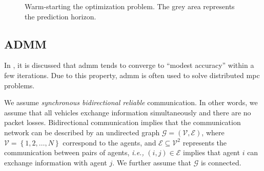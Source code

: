 \begin{figure}[!htbp]
    \centering
    
    
    \caption{Warm-starting the optimization problem. The grey area represents the prediction horizon.}
    \label{fig:MPC_warm_start}
\end{figure}



\subsection{ADMM}



In \cite{boyd_2011_distributed}, it is discussed that \gls{admm} tends to converge to ``modest accuracy'' within a few iterations.
Due to this property, \gls{admm} is often used to solve distributed \gls{mpc} problems.

We assume \emph{synchronous bidirectional reliable} communication.
In other words, we assume that all vehicles exchange information simultaneously and there are no packet losses.
Bidirectional communication implies that the communication network can be described by an undirected graph $\mathcal{G} = \left(\mathcal{V}, \mathcal{E}\right)$, where $\mathcal{V} = \left\{1, 2, \ldots, N\right\}$ correspond to the agents, and $\mathcal{E} \subseteq \mathcal{V}^2$ represents the communication between pairs of agents, \emph{i.e.,} $(i,j) \in \mathcal{E}$ implies that agent $i$ can exchange information with agent $j$. We further assume that $\mathcal{G}$ is connected.

